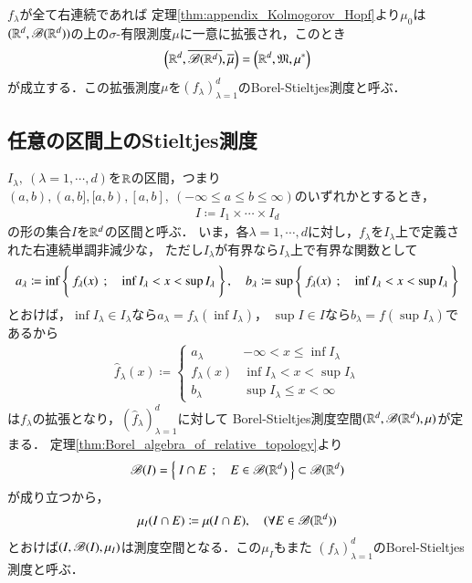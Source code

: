 	$f_\lambda$が全て右連続であれば
	定理\ref{thm:appendix_Kolmogorov_Hopf}より$\mu_0$は
	$(\mathbb{R}^d,\mathscr{B}(\mathbb{R}^d))$の上の$\sigma$-有限測度$\mu$に一意に拡張され，このとき
	\begin{align}
		\left(\mathbb{R}^d,\overline{\mathscr{B}(\mathbb{R}^d)},\overline{\mu}\right) 
		= \left(\mathbb{R}^d,\mathfrak{M},\mu^*\right)
	\end{align}
	が成立する．この拡張測度$\mu$を$(f_\lambda)_{\lambda=1}^d$のBorel-Stieltjes測度と呼ぶ．
	
\subsection{任意の区間上のStieltjes測度}
	$I_\lambda,\ (\lambda=1,\cdots,d)$を$\mathbb{R}$の区間，つまり
	$(a,b),(a,b],[a,b),[a,b],\ (-\infty \leq a \leq b \leq \infty)$のいずれかとするとき，
	\begin{align}
		I \coloneqq I_1 \times \cdots \times I_d
	\end{align}
	の形の集合$I$を$\mathbb{R}^d$の区間と呼ぶ．
	いま，各$\lambda=1,\cdots,d$に対し，$f_\lambda$を$I_\lambda$上で定義された右連続単調非減少な，
	ただし$I_\lambda$が有界なら$I_\lambda$上で有界な関数として
	\begin{align}
		a_\lambda \coloneqq \operatorname*{inf}_{} \left\{\ f_\lambda(x)\ \, ; \quad \operatorname*{inf}_{} I_\lambda < x < \operatorname*{sup}_{} I_\lambda\ \right\},
		\quad b_\lambda \coloneqq \operatorname*{sup}_{} \left\{\ f_\lambda(x)\ \, ; \quad \operatorname*{inf}_{} I_\lambda < x < \operatorname*{sup}_{} I_\lambda\ \right\}
	\end{align}
	とおけば，$\inf{}{I_\lambda} \in I_\lambda$なら$a_\lambda = f_\lambda(\inf{}{I_\lambda})$，
	$\sup{}{I} \in I$なら$b_\lambda = f(\sup{}{I_\lambda})$であるから
	\begin{align}
		\hat{f}_\lambda(x) \coloneqq 
		\begin{cases}
			a_\lambda & -\infty < x \leq \inf{}{I_\lambda} \\
			f_\lambda(x) & \inf{}{I_\lambda} < x < \sup{}{I_\lambda} \\
			b_\lambda & \sup{}{I_\lambda} \leq x < \infty
		\end{cases}
	\end{align}
	は$f_\lambda$の拡張となり，$\left( \hat{f}_\lambda \right)_{\lambda=1}^d$に対して
	Borel-Stieltjes測度空間$(\mathbb{R}^d,\mathscr{B}(\mathbb{R}^d),\mu)$が定まる．
	定理\ref{thm:Borel_algebra_of_relative_topology}より
	\begin{align}
		\mathscr{B}(I) = \left\{\ I \cap E\ \, ; \quad E \in \mathscr{B}(\mathbb{R}^d)\ \right\} \subset \mathscr{B}(\mathbb{R}^d)
	\end{align}
	が成り立つから，
	\begin{align}
		\mu_I(I \cap E) \coloneqq \mu(I \cap E),
		\quad (\forall E \in \mathscr{B}(\mathbb{R}^d))
	\end{align}
	とおけば$(I,\mathscr{B}(I),\mu_I)$は測度空間となる．この$\mu_I$もまた
	$(f_\lambda)_{\lambda=1}^d$のBorel-Stieltjes測度と呼ぶ．
	
